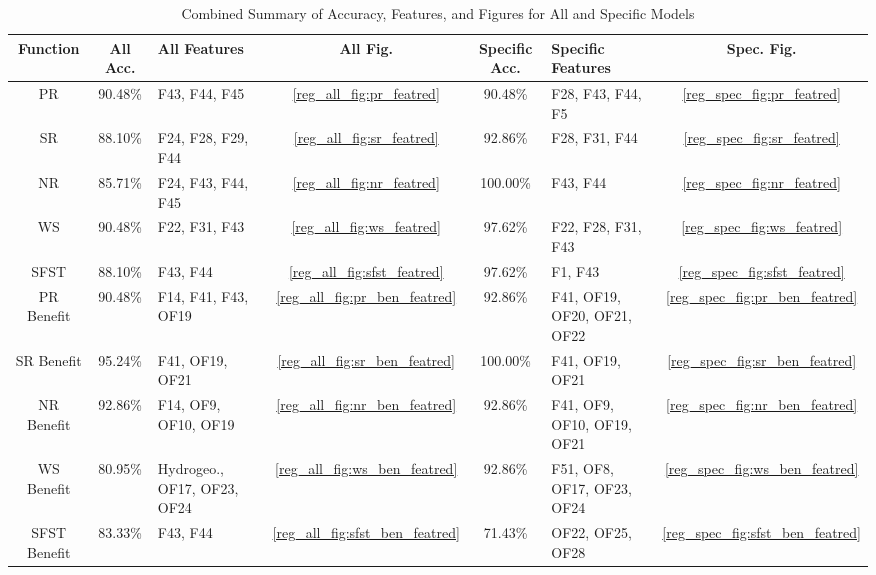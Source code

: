 \begin{table}[H]
\centering
\begin{tabular}{|c|c|p{2cm}|c|c|p{2cm}|c|}
\hline
\textbf{Function} & \textbf{All Acc.} & \textbf{All Features} & \textbf{All Fig.} & \textbf{Specific Acc.} & \textbf{Specific Features} & \textbf{Spec. Fig.} \\
\hline
PR & 90.48\% & F43, F44, F45 & \ref{reg_all_fig:pr_featred} & 90.48\% & F28, F43, F44, F5 & \ref{reg_spec_fig:pr_featred} \\
\hline
SR & 88.10\% & F24, F28, F29, F44 & \ref{reg_all_fig:sr_featred} & 92.86\% & F28, F31, F44 & \ref{reg_spec_fig:sr_featred} \\
\hline
NR & 85.71\% & F24, F43, F44, F45 & \ref{reg_all_fig:nr_featred} & 100.00\% & F43, F44 & \ref{reg_spec_fig:nr_featred} \\
\hline
WS & 90.48\% & F22, F31, F43 & \ref{reg_all_fig:ws_featred} & 97.62\% & F22, F28, F31, F43 & \ref{reg_spec_fig:ws_featred} \\
\hline
SFST & 88.10\% & F43, F44 & \ref{reg_all_fig:sfst_featred} & 97.62\% & F1, F43 & \ref{reg_spec_fig:sfst_featred} \\
\hline
PR Benefit & 90.48\% & F14, F41, F43, OF19 & \ref{reg_all_fig:pr_ben_featred} & 92.86\% & F41, OF19, OF20, OF21, OF22 & \ref{reg_spec_fig:pr_ben_featred} \\
\hline
SR Benefit & 95.24\% & F41, OF19, OF21 & \ref{reg_all_fig:sr_ben_featred} & 100.00\% & F41, OF19, OF21 & \ref{reg_spec_fig:sr_ben_featred} \\
\hline
NR Benefit & 92.86\% & F14, OF9, OF10, OF19 & \ref{reg_all_fig:nr_ben_featred} & 92.86\% & F41, OF9, OF10, OF19, OF21 & \ref{reg_spec_fig:nr_ben_featred} \\
\hline
WS Benefit & 80.95\% & Hydrogeo., OF17, OF23, OF24 & \ref{reg_all_fig:ws_ben_featred} & 92.86\% & F51, OF8, OF17, OF23, OF24 & \ref{reg_spec_fig:ws_ben_featred} \\
\hline
SFST Benefit & 83.33\% & F43, F44 & \ref{reg_all_fig:sfst_ben_featred} & 71.43\% & OF22, OF25, OF28 & \ref{reg_spec_fig:sfst_ben_featred} \\
\hline
\end{tabular}
\caption{Combined Summary of Accuracy, Features, and Figures for All and Specific Models}
\label{tab_reg:compare}
\end{table}